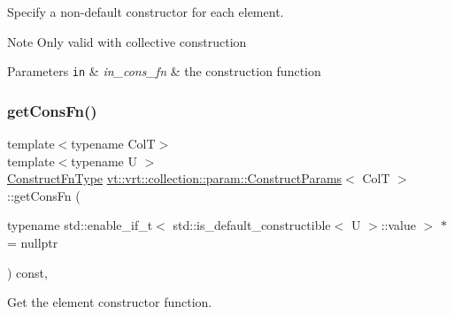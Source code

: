 Specify a non-\/default constructor for each element. 

\begin{DoxyNote}{Note}
Only valid with collective construction
\end{DoxyNote}

\begin{DoxyParams}[1]{Parameters}
\mbox{\tt in}  & {\em in\+\_\+cons\+\_\+fn} & the construction function \\
\hline
\end{DoxyParams}
\mbox{\label{structvt_1_1vrt_1_1collection_1_1param_1_1_construct_params_ae6f31177ec60c98d598b6df9eda8d06a}} 
\subsubsection{\texorpdfstring{get\+Cons\+Fn()}{getConsFn()}\hspace{0.1cm}{\footnotesize\ttfamily [1/2]}}
{\footnotesize\ttfamily template$<$typename ColT$>$ \\
template$<$typename U $>$ \\
\hyperlink{structvt_1_1vrt_1_1collection_1_1param_1_1_construct_params_a7ad7bdf4220701e54b485f45e08b1736}{Construct\+Fn\+Type} \hyperlink{structvt_1_1vrt_1_1collection_1_1param_1_1_construct_params}{vt\+::vrt\+::collection\+::param\+::\+Construct\+Params}$<$ ColT $>$\+::get\+Cons\+Fn (\begin{DoxyParamCaption}\item[{typename std\+::enable\+\_\+if\+\_\+t$<$ std\+::is\+\_\+default\+\_\+constructible$<$ U $>$\+::value $>$ $\ast$}]{ = {\ttfamily nullptr} }\end{DoxyParamCaption}) const\hspace{0.3cm}{\ttfamily [inline]}, {\ttfamily [private]}}



Get the element constructor function. 

\mbox{\label{structvt_1_1vrt_1_1collection_1_1param_1_1_construct_params_ab0d89974dff84686c16173b93881c0e8}} 
